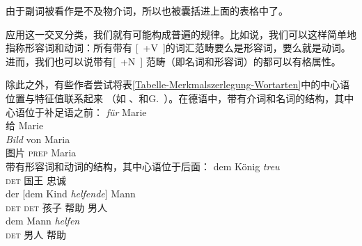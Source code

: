 \noindent
由于副词被看作是不及物介词\label{Seite-Adverbien-PP}，所以也被囊括进上面的表格中了。

应用这一交叉分类，我们就有可能构成普遍的规律。比如说，我们可以这样简单地指称形容词和动词：所有带有 [~+V~]的词汇范畴要么是形容词，要么就是动词。进而，我们也可以说带有[~+N~] 范畴（即名词和形容词）的都可以有格属性。

除此之外，有些作者尝试将表\ref{Tabelle-Merkmalszerlegung-Wortarten}中的中心语位置与特征值联系起来
（如 \citealp[]{Grewendorf88a}、\citealp[]{Haftka96a}和G.\ \citealp[]{GMueller2011a}）。在德语中，带有介词和名词的结构，其中心语位于补足语之前：
\eal
\ex
\gll \emph{für} Marie\\
	 给 Marie\\
\ex 
\gll \emph{Bild} von Maria\\
	 图片 \textsc{prep} Maria\\
\zl
带有形容词和动词的结构，其中心语位于后面：
\eal
\ex 
\gll dem König \emph{treu}\\
     \textsc{det} 国王 忠诚\\
\ex 
\gll der [dem Kind \emph{helfende}] Mann\\
     \textsc{det} \spacebr\textsc{det} 孩子 帮助 男人\\
\ex 
\gll dem Mann \emph{helfen}\\
      \textsc{det} 男人 帮助\\
